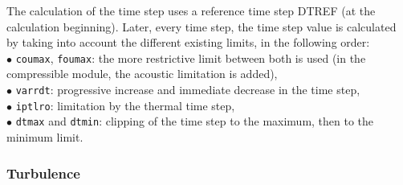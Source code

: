 The calculation of the time step uses a reference time step DTREF (at
the calculation beginning). Later, every time step, the time step value
is calculated by taking into account the different existing limits, in
the following order: \\
\hspace*{1.cm}$\bullet$ {\tt coumax}, {\tt foumax}: the more restrictive limit between
both is used (in the compressible module, the acoustic limitation is added),\\
\hspace*{1.cm}$\bullet$ {\tt varrdt}:  progressive increase and immediate
decrease in the time step,\\
\hspace*{1.cm}$\bullet$ {\tt iptlro}: limitation by the thermal time step,\\
\hspace*{1.cm}$\bullet$ {\tt dtmax} and {\tt dtmin}: clipping of the time step to
the maximum, then to the minimum limit.\\


\subsubsection{Turbulence}

